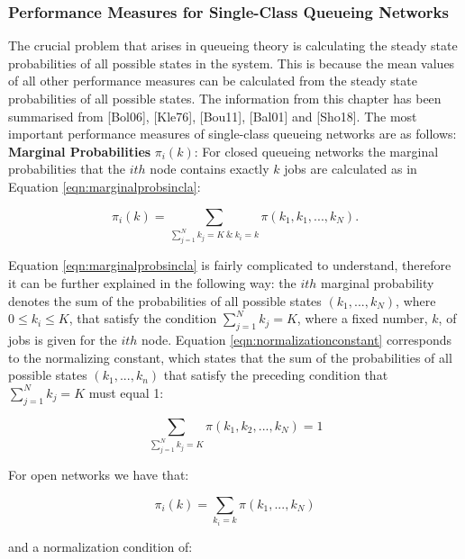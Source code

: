 \documentclass[a4paper,11pt,titlepage]{article}
\begin{document}
\subsubsection{Performance Measures for Single-Class Queueing Networks}

The crucial problem that arises in queueing theory is calculating the steady state probabilities of all possible states in the system. This is because the mean values of all other performance measures can be calculated from the steady state probabilities of all possible states. The information from this chapter has been summarised from [Bol06], [Kle76], [Bou11], [Bal01] and [Sho18]. The most important performance measures of single-class queueing networks are as follows: \\

\textbf{Marginal Probabilities} $\pi_i(k)$: For closed queueing networks the marginal probabilities that the $ith$ node contains exactly $k$ jobs are calculated as in Equation \ref{eqn:marginalprobsincla}:

\begin{equation}
    \pi_i(k) = \sum_{\sum_{j=1}^{N}k_j = K \: \& \: k_i = k} \pi(k_1,k_1,...,k_N).
    \label{eqn:marginalprobsincla}
\end{equation}

Equation \ref{eqn:marginalprobsincla} is fairly complicated to understand, therefore it can be further explained in the following way: the $ith$ marginal probability denotes the sum of the probabilities of all possible states $(k_1,...,k_N)$, where $0 \leq k_i \leq K$, that satisfy the condition $\sum_{j=1}^{N} k_j = K$, where a fixed number, $k$, of jobs is given for the $ith$ node. Equation \ref{eqn:normalizationconstant} corresponds to the normalizing constant, which states that the sum of the probabilities of all possible states $(k_1,...,k_n)$ that satisfy the preceding condition that $\sum_{j=1}^{N} k_j = K$ must equal 1: 

\begin{equation}
    \sum_{\sum_{j=1}^{N} k_j = K} \pi(k_1, k_2,...,k_N) = 1
    \label{eqn:normalizationconstant}
\end{equation}

For open networks we have that:

\begin{equation}
    \pi_i(k) = \sum_{k_i = k} \pi(k_1,...,k_N)
\end{equation}

and a normalization condition of: 
\end{document}
